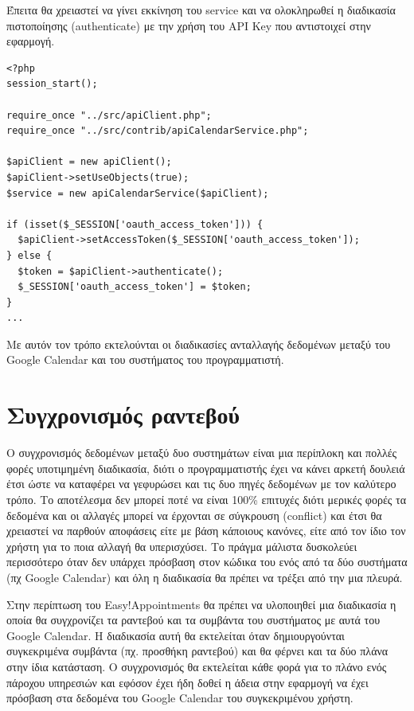 Έπειτα θα χρειαστεί να γίνει εκκίνηση του service και να ολοκληρωθεί η διαδικασία πιστοποίησης (authenticate) με την χρήση του API Key  που αντιστοιχεί στην εφαρμογή.

\begin{lstlisting}[breaklines=true]
<?php
session_start();

require_once "../src/apiClient.php";
require_once "../src/contrib/apiCalendarService.php";

$apiClient = new apiClient();
$apiClient->setUseObjects(true);
$service = new apiCalendarService($apiClient);

if (isset($_SESSION['oauth_access_token'])) {
  $apiClient->setAccessToken($_SESSION['oauth_access_token']);
} else {
  $token = $apiClient->authenticate();
  $_SESSION['oauth_access_token'] = $token;
}
...
\end{lstlisting}

Με αυτόν τον τρόπο εκτελούνται οι διαδικασίες ανταλλαγής δεδομένων μεταξύ του Google Calendar και του συστήματος του προγραμματιστή.

\section{Συγχρονισμός ραντεβού}
Ο συγχρονισμός δεδομένων μεταξύ δυο συστημάτων είναι μια περίπλοκη και πολλές φορές υποτιμημένη διαδικασία, διότι ο προγραμματιστής έχει να κάνει αρκετή δουλειά έτσι ώστε να καταφέρει να γεφυρώσει και τις δυο πηγές δεδομένων με τον καλύτερο τρόπο. Το αποτέλεσμα δεν μπορεί ποτέ να είναι 100\% επιτυχές διότι μερικές φορές τα δεδομένα και οι αλλαγές μπορεί να έρχονται σε σύγκρουση (conflict) και έτσι θα χρειαστεί να παρθούν αποφάσεις είτε με βάση κάποιους κανόνες, είτε από τον ίδιο τον χρήστη για το ποια αλλαγή θα υπερισχύσει. Το πράγμα μάλιστα δυσκολεύει περισσότερο όταν δεν υπάρχει πρόσβαση στον κώδικα του ενός από τα δύο συστήματα (πχ Google Calendar) και όλη η διαδικασία θα πρέπει να τρέξει από την μια πλευρά. 

Στην περίπτωση του Easy!Appointments θα πρέπει να υλοποιηθεί μια διαδικασία η οποία θα συγχρονίζει τα ραντεβού και τα συμβάντα του συστήματος με αυτά του Google Calendar. Η διαδικασία αυτή θα εκτελείται όταν δημιουργούνται συγκεκριμένα συμβάντα (πχ. προσθήκη ραντεβού) και θα φέρνει και τα δύο πλάνα στην ίδια κατάσταση. Ο συγχρονισμός θα εκτελείται κάθε φορά για το πλάνο ενός πάροχου υπηρεσιών και εφόσον έχει ήδη δοθεί η άδεια στην εφαρμογή να έχει πρόσβαση στα δεδομένα του Google Calendar του συγκεκριμένου χρήστη.

